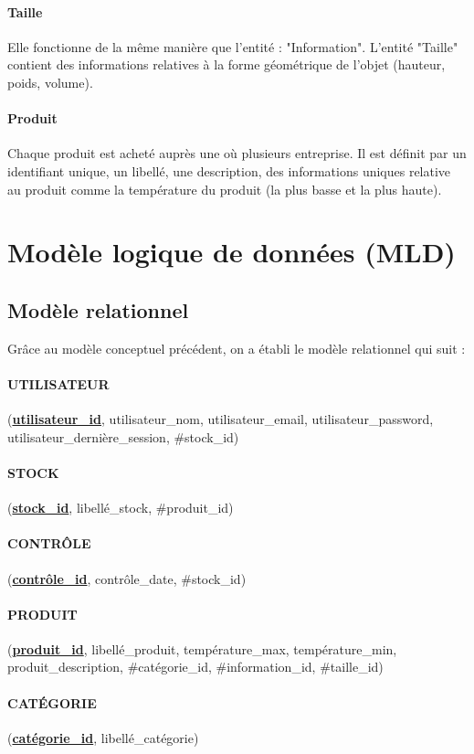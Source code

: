\paragraph{Taille} Elle fonctionne de la même manière que l'entité : "Information". L'entité "Taille"
contient des informations relatives à la forme géométrique de l'objet (hauteur, poids, volume).

\paragraph{Produit} Chaque produit est acheté auprès une où plusieurs entreprise. Il est définit par un identifiant unique, un libellé, une description, des informations uniques relative au produit comme la température du produit (la plus basse et la plus haute).


\section{Modèle logique de données (MLD)}
\subsection{Modèle relationnel}
Grâce au modèle conceptuel précédent, on a établi le modèle relationnel qui suit :

\paragraph{UTILISATEUR} (\textbf{\underline{utilisateur\_id}}, utilisateur\_nom, utilisateur\_email, utilisateur\_password, utilisateur\_dernière\_session, \#stock\_id)
\paragraph{STOCK} (\textbf{\underline{stock\_id}}, libellé\_stock, \#produit\_id)
\paragraph{CONTRÔLE} (\textbf{\underline{contrôle\_id}}, contrôle\_date, \#stock\_id)
\paragraph{PRODUIT} (\textbf{\underline{produit\_id}}, libellé\_produit, température\_max, température\_min, produit\_description, \#catégorie\_id, \#information\_id, \#taille\_id)
\paragraph{CATÉGORIE } (\textbf{\underline{catégorie\_id}}, libellé\_catégorie)
